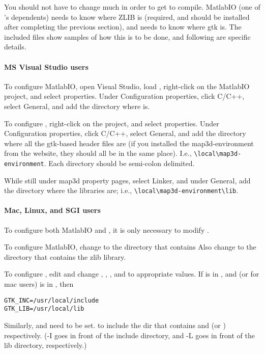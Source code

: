 You should not have to change much in order to get \map{} to compile.
MatlabIO (one of \map{}'s dependents) needs to know where ZLIB is
(required, and should be installed after completing the previous section),
and \map{} needs to know where gtk is.  The included files show samples of
how this is to be done, and following are specific details.

\paragraph{MS Visual Studio users}
To configure MatlabIO, open Visual Studio, load ,
right-click on the MatlabIO project, and select properties.  Under
Configuration properties, click C/C++, select General, and add the
directory where  is.

To configure \map{}, right-click on the \map{} project, and select
properties.  Under Configuration properties, click C/C++, select General,
and add the directory where all the gtk-based header files are (if you
installed the map3d-environment from the website, they should all be in the
same place).  I.e., \verb|\local\map3d-environment|.  Each directory
should be semi-colon delimited.

While still under map3d property pages, select Linker, and under General,
add the directory where the libraries are; i.e.,
\verb|\local\map3d-environment\lib|.


\paragraph{Mac, Linux, and SGI users}
To configure both MatlabIO and \map{}, it is only necessary to
modify .

To configure MatlabIO, change
 to the directory that contains   Also change
 to the directory that contains the zlib library.

To configure \map{}, edit  and change
, , , and  to
appropriate values.  If  is in
, and  (or
 for mac users) is in , then
%
\begin{verbatim}
GTK_INC=/usr/local/include
GTK_LIB=/usr/local/lib
\end{verbatim}
%
Similarly,  and  need to be set.
to include the dir that contains  and
 (or ) respectively.  (-I goes in
front of the include directory, and -L goes in front of the lib directory,
respectively.)
    
